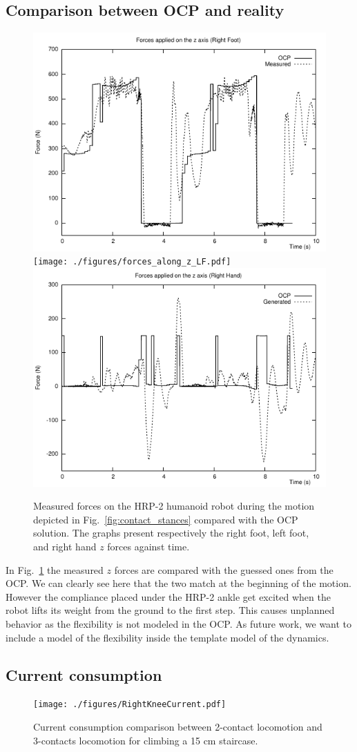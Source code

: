 \subsection*{Comparison between OCP and reality}

\begin{figure}[h]
  \centering
  \includegraphics[width=0.35\linewidth , keepaspectratio]{./figures/forces_along_z_RF.pdf}\\%
  \texttt{[image: ./figures/forces\_along\_z\_LF.pdf]}%
  \includegraphics[width=0.35\linewidth , keepaspectratio]{./figures/forces_along_z_RH.pdf}
\caption{Measured forces on the HRP-2 humanoid robot during the motion depicted in Fig.~\ref{fig:contact_stances} compared with the OCP solution. The graphs present respectively the right foot, left foot, and right hand $z$ forces against time.}
\label{fig:measured_and_computed_forces}
\end{figure}

In Fig.~\ref{fig:measured_and_computed_forces} the measured $z$ forces are compared with the guessed ones from the OCP.
We can clearly see here that the two match at the beginning of the motion.
However the compliance placed under the HRP-2 ankle get excited when the robot lifts its weight from the ground to the first step.
This causes unplanned behavior as the flexibility is not modeled in the OCP.
As future work, we want to include a model of the flexibility inside the template model of the dynamics.


\subsection*{Current consumption}

\begin{figure}[h]
  \centering
    \texttt{[image: ./figures/RightKneeCurrent.pdf]}
  \caption{Current consumption comparison between 2-contact locomotion and 3-contacts locomotion for climbing a 15 cm staircase.}%
  \label{fig:current_consumption}%
\end{figure}%

